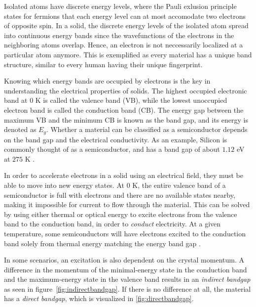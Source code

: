 

Isolated atoms have discrete energy levels, where the Pauli exlusion principle \cite{Pauli1925} states for fermions that each energy level can at most accomodate two electrons of opposite spin. In a solid, the discrete energy levels of the isolated atom spread into continuous energy bands since the wavefunctions of the electrons in the neighboring atoms overlap. Hence, an electron is not neccessarily localized at a particular atom anymore. This is exemplified as every material has a unique band structure, similar to every human having their unique fingerprint.

Knowing which energy bands are occupied by electrons is the key in understanding the electrical properties of solids. The highest occupied electronic band at $0$ K is called the valence band (VB), while the lowest unoccupied electron band is called the conduction band (CB). The energy gap between the maximum VB and the minimum CB is known as the band gap, and its energy is denoted as $E_g$. Whether a material can be classified as a semiconductor depends on the band gap and the electrical conductivity. As an example, Silicon is commonly thought of as a semiconductor, and has a band gap of about $1.12$ eV at $275$ K \cite{Martienssen2005}.



In order to accelerate electrons in a solid using an electrical field, they must be able to move into new energy states. At $0$ K, the entire valence band of a semiconductor is full with electrons and there are no available states nearby, making it impossible for current to flow through the material. This can be solved by using either thermal or optical energy to excite electrons from the valence band to the conduction band, in order to \textit{conduct} electricity. At a given temperature, some semiconductors will have electrons excited to the conduction band solely from thermal energy matching the energy band gap \cite{BenStreetman2015}.

In some scenarios, an excitation is also dependent on the crystal momentum.
A difference in the momentum of the minimal-energy state in the conduction band and the maximum-energy state in the valence band results in an \textit{indirect bandgap} as seen in figure \autoref{fig:indirectbandgap}. If there is no difference at all, the material has a \textit{direct bandgap}, which is visualized in \autoref{fig:directbandgap}.

